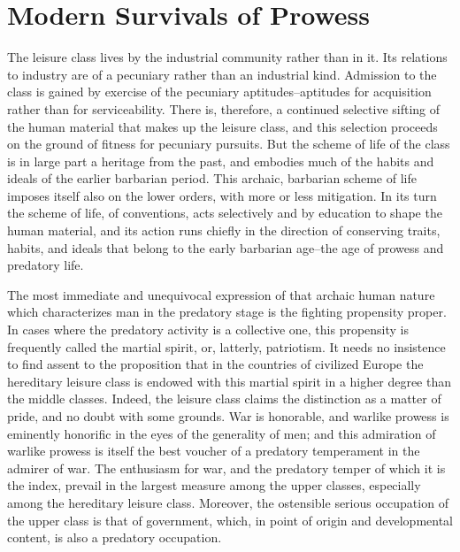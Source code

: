 \documentclass[12pt]{report}
\begin{document}
\chapter{Modern Survivals of Prowess}

The leisure class lives by the industrial community rather than in it.
Its relations to industry are of a pecuniary rather than an industrial
kind. Admission to the class is gained by exercise of the pecuniary
aptitudes--aptitudes for acquisition rather than for serviceability.
There is, therefore, a continued selective sifting of the human material
that makes up the leisure class, and this selection proceeds on the
ground of fitness for pecuniary pursuits. But the scheme of life of the
class is in large part a heritage from the past, and embodies much of
the habits and ideals of the earlier barbarian period. This archaic,
barbarian scheme of life imposes itself also on the lower orders, with
more or less mitigation. In its turn the scheme of life, of conventions,
acts selectively and by education to shape the human material, and its
action runs chiefly in the direction of conserving traits, habits, and
ideals that belong to the early barbarian age--the age of prowess and
predatory life.

The most immediate and unequivocal expression of that archaic human
nature which characterizes man in the predatory stage is the fighting
propensity proper. In cases where the predatory activity is a collective
one, this propensity is frequently called the martial spirit, or,
latterly, patriotism. It needs no insistence to find assent to the
proposition that in the countries of civilized Europe the hereditary
leisure class is endowed with this martial spirit in a higher
degree than the middle classes. Indeed, the leisure class claims the
distinction as a matter of pride, and no doubt with some grounds. War is
honorable, and warlike prowess is eminently honorific in the eyes of the
generality of men; and this admiration of warlike prowess is itself
the best voucher of a predatory temperament in the admirer of war. The
enthusiasm for war, and the predatory temper of which it is the index,
prevail in the largest measure among the upper classes, especially
among the hereditary leisure class. Moreover, the ostensible serious
occupation of the upper class is that of government, which, in point of
origin and developmental content, is also a predatory occupation.
\end{document}

